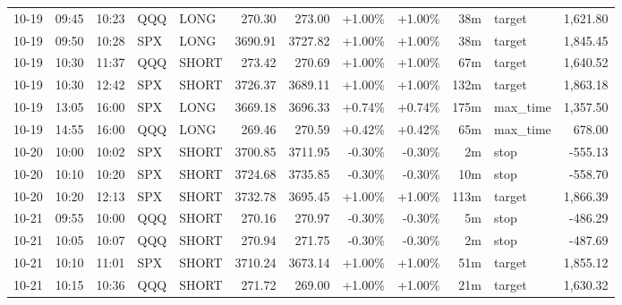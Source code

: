 \documentclass[11pt,a4paper]{article}
\begin{document}
\begin{center}
\begin{longtable}{>{\color{txtmain}}l l l l l r r r r r >{\color{txtmain}}l r}
10-19 & 09:45 & 10:23 & QQQ & LONG & 270.30 & 273.00 & \textcolor{wingreen}{+1.00\%} & \textcolor{wingreen}{+1.00\%} & 38m & target & \textcolor{wingreen}{1,621.80} \\
10-19 & 09:50 & 10:28 & SPX & LONG & 3690.91 & 3727.82 & \textcolor{wingreen}{+1.00\%} & \textcolor{wingreen}{+1.00\%} & 38m & target & \textcolor{wingreen}{1,845.45} \\
10-19 & 10:30 & 11:37 & QQQ & SHORT & 273.42 & 270.69 & \textcolor{wingreen}{+1.00\%} & \textcolor{wingreen}{+1.00\%} & 67m & target & \textcolor{wingreen}{1,640.52} \\
10-19 & 10:30 & 12:42 & SPX & SHORT & 3726.37 & 3689.11 & \textcolor{wingreen}{+1.00\%} & \textcolor{wingreen}{+1.00\%} & 132m & target & \textcolor{wingreen}{1,863.18} \\
10-19 & 13:05 & 16:00 & SPX & LONG & 3669.18 & 3696.33 & \textcolor{wingreen}{+0.74\%} & \textcolor{wingreen}{+0.74\%} & 175m & max\_time & \textcolor{wingreen}{1,357.50} \\
10-19 & 14:55 & 16:00 & QQQ & LONG & 269.46 & 270.59 & \textcolor{wingreen}{+0.42\%} & \textcolor{wingreen}{+0.42\%} & 65m & max\_time & \textcolor{wingreen}{678.00} \\
10-20 & 10:00 & 10:02 & SPX & SHORT & 3700.85 & 3711.95 & \textcolor{lossred}{-0.30\%} & \textcolor{lossred}{-0.30\%} & 2m & stop & \textcolor{lossred}{-555.13} \\
10-20 & 10:10 & 10:20 & SPX & SHORT & 3724.68 & 3735.85 & \textcolor{lossred}{-0.30\%} & \textcolor{lossred}{-0.30\%} & 10m & stop & \textcolor{lossred}{-558.70} \\
10-20 & 10:20 & 12:13 & SPX & SHORT & 3732.78 & 3695.45 & \textcolor{wingreen}{+1.00\%} & \textcolor{wingreen}{+1.00\%} & 113m & target & \textcolor{wingreen}{1,866.39} \\
10-21 & 09:55 & 10:00 & QQQ & SHORT & 270.16 & 270.97 & \textcolor{lossred}{-0.30\%} & \textcolor{lossred}{-0.30\%} & 5m & stop & \textcolor{lossred}{-486.29} \\
10-21 & 10:05 & 10:07 & QQQ & SHORT & 270.94 & 271.75 & \textcolor{lossred}{-0.30\%} & \textcolor{lossred}{-0.30\%} & 2m & stop & \textcolor{lossred}{-487.69} \\
10-21 & 10:10 & 11:01 & SPX & SHORT & 3710.24 & 3673.14 & \textcolor{wingreen}{+1.00\%} & \textcolor{wingreen}{+1.00\%} & 51m & target & \textcolor{wingreen}{1,855.12} \\
10-21 & 10:15 & 10:36 & QQQ & SHORT & 271.72 & 269.00 & \textcolor{wingreen}{+1.00\%} & \textcolor{wingreen}{+1.00\%} & 21m & target & \textcolor{wingreen}{1,630.32} \\

\end{longtable}
\end{center}
\end{document}
